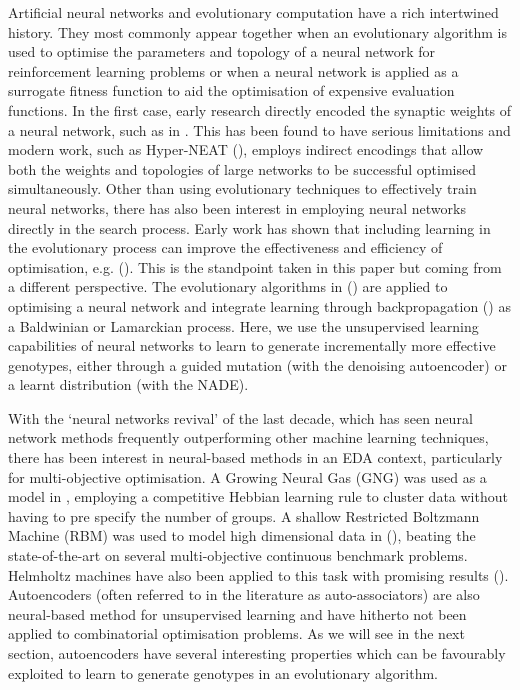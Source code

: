 \documentclass[twoside]{article}
\begin{document}
Artificial neural networks and evolutionary computation have a rich intertwined history. They most commonly appear together when an evolutionary algorithm is used to optimise the parameters and topology of a neural network for reinforcement learning problems or when a neural network is applied as a surrogate fitness function to aid the optimisation of expensive evaluation functions. In the first case, early research directly encoded the synaptic weights of a neural network, such as in \cite{montana1989training}. This has been found to have serious limitations and modern work, such as Hyper-NEAT (\cite{stanley2009hypercube}), employs indirect encodings that allow both the weights and topologies of large networks to be successful optimised simultaneously. Other than using evolutionary techniques to effectively train neural networks, there has also been interest in employing neural networks directly in the search process. Early work has shown that including learning in the evolutionary process can improve the effectiveness and efficiency of optimisation, e.g. (\cite{hinton1987learning,nolfi1994learning}). This is the standpoint taken in this paper but coming from a different perspective. The evolutionary algorithms in (\cite{hinton1987learning,nolfi1994learning}) are applied to optimising a neural network and integrate learning through backpropagation (\cite{rumelhart1988learning}) as a Baldwinian or Lamarckian process. Here, we use the unsupervised learning capabilities of neural networks to learn to generate incrementally more effective genotypes, either through a guided mutation (with the denoising autoencoder) or a learnt distribution (with the NADE).

With the `neural networks revival' of the last decade, which has seen neural network methods frequently outperforming other machine learning techniques, there has been interest in neural-based methods in an EDA context, particularly for multi-objective optimisation. A Growing Neural Gas (GNG) was used as a model in \cite{marti2008introducing}, employing a competitive Hebbian learning rule to cluster data without having to pre specify the number of groups. A shallow Restricted Boltzmann Machine (RBM) was used to model high dimensional data in (\cite{tang2010restricted,shim2013multi}), beating the state-of-the-art on several multi-objective continuous benchmark problems. Helmholtz machines have also been applied to this task with promising results (\cite{zhang2000bayesian}). Autoencoders (often referred to in the literature as auto-associators) are also neural-based method for unsupervised learning and have hitherto not been applied to combinatorial optimisation problems. As we will see in the next section, autoencoders have several interesting properties which can be favourably exploited to learn to generate genotypes in an evolutionary algorithm.
\end{document}
